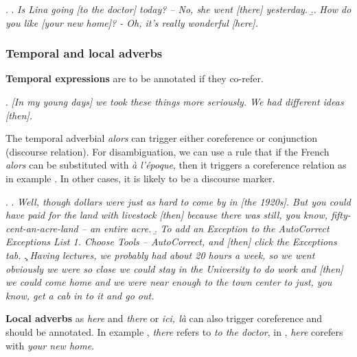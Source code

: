 \documentclass[a4paper]{article}
\begin{document}
\ex.
\a. {\sl Is Lina going [to the doctor] today? -- No, she went [there] yesterday.}
\b.. {\sl How do you like [your new home]? - Oh, it's really wonderful [here].}

\subsubsection{Temporal and local adverbs}


\textbf{Temporal expressions} are to be annotated if they co-refer.

\ex.
\textsl{[In my young days] we took these things more seriously. We had different ideas [then].}

The temporal adverbial \textsl{alors} can trigger either coreference or
conjunction (discourse relation). For disambiguation, we can use a rule that if
the French {\sl alors} can be substituted with {\sl à l'époque}, then it
triggers a coreference relation as in example \Next[a]. In  other cases, it is
likely to be a discourse marker. 

\ex.
\a. {\sl Well, though dollars were just as hard to come by in [the 1920s]. But you could have paid for the land with livestock [then] because there was still, you know, fifty-cent-an-acre-land -- an entire acre.}
\b. {\sl To add an Exception to the AutoCorrect Exceptions List 1. Choose Tools -- AutoCorrect, and [then] click the Exceptions tab.}
\c. {\sl 
Having lectures, we probably had about 20 hours a week, so we went obviously we were so close we could stay in the University to do work and [then] we could come home and we were near enough to the town center to just, you know, get a cab in to it and go out.}

\textbf{Local adverbs} as {\sl here} and {\sl there} or {\sl ici, là} can also trigger
coreference and should be annotated. In example \Next[a], {\sl there} refers to
{\sl to the doctor}, in \Next[b], {\sl here} corefers with {\sl your new home}.
\end{document}
